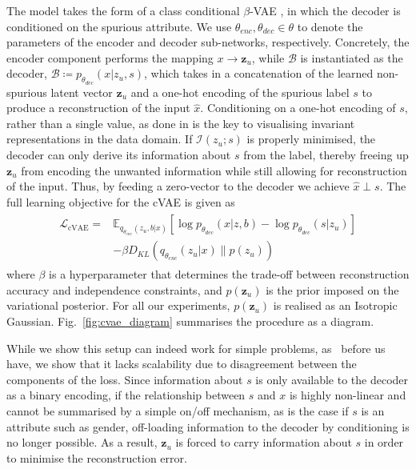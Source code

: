 The model takes the form of a class conditional $\beta$-VAE \cite{higgins2017beta}, in which the decoder is conditioned on the spurious attribute.
We use $\theta_{enc}, \theta_{dec} \in \theta$ to denote the parameters of the encoder and decoder sub-networks, respectively.
Concretely, the encoder component performs the mapping $x \rightarrow{\bm{z}_u}$, while $\mathcal{B}$ is instantiated as the decoder,
$\mathcal{B} \coloneqq p_{\theta_{dec}}(x|z_u, s)$, which takes in a concatenation of the learned non-spurious latent vector $\bm{z}_u$ and a one-hot encoding of the spurious label $s$ to produce a reconstruction of the input $\hat{x}$.
Conditioning on a one-hot encoding of $s$, rather than a single value, as done in \cite{madras2018learning} is the key to visualising invariant representations in the data domain.
If $\mathcal{I}(z_u; s)$ is properly minimised, the decoder can only derive its information about $s$ from the label, thereby freeing up $\bm{z}_u$ from encoding the unwanted information while still allowing for reconstruction of the input.
Thus, by feeding a zero-vector to the decoder we achieve $\hat{x} \perp s$.
The full learning objective for the cVAE is given as
\begin{align}
\begin{split}
    \mathcal{L}_{\mathrm{cVAE}} =& \mathbb{E}_{q_{\theta_{enc}}(z_u, b|x)}[\log p_{\theta_{dec}}(x|z, b) - \log p_{\theta_{dec}}(s|z_u)] \\ 
    &- \beta D_{KL}(q_{\theta_{enc}}(z_u |x) \| p(z_u))
\end{split}
\end{align}
where $\beta$ is a hyperparameter that determines the trade-off between reconstruction accuracy and independence constraints,
and $p(\bm{z}_u)$ is the prior imposed on the variational posterior.
For all our experiments, $p(\bm{z}_u)$ is realised as an Isotropic Gaussian.
Fig.~\ref{fig:cvae_diagram} summarises the procedure as a diagram.

While we show this setup can indeed work for simple problems, as~\cite{madras2018learning} before us have, we show that it lacks scalability due to disagreement between the components of the loss.
Since information about $s$ is only available to the decoder as a binary encoding,
if the relationship between $s$ and $x$ is highly non-linear and cannot be summarised by a simple on/off mechanism, as is the case if $s$ is an attribute such as gender,
off-loading information to the decoder by conditioning is no longer possible. As a result, $\bm{z}_u$ is forced to carry information about $s$ in order to minimise the reconstruction error. 

